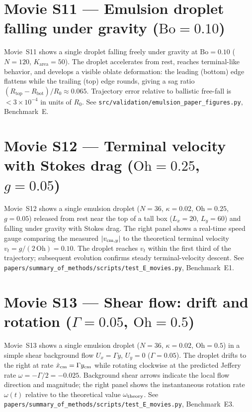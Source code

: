 \documentclass[aps,pre,twocolumn,floatfix]{revtex4-2}
\begin{document}
\section*{Movie S11 — Emulsion droplet falling under gravity ($\mathrm{Bo} = 0.10$)}

Movie~S11 shows a single droplet falling freely under gravity at
$\mathrm{Bo} = 0.10$ ($N = 120$, $K_\mathrm{area} = 50$).  The droplet
accelerates from rest, reaches terminal-like behavior, and develops a
visible oblate deformation: the leading (bottom) edge flattens while the
trailing (top) edge rounds, giving a sag ratio
$(R_\mathrm{top} - R_\mathrm{bot})/R_0 \approx 0.065$.  Trajectory error
relative to ballistic free-fall is $< 3 \times 10^{-4}$ in units of $R_0$.
See \texttt{src/validation/emulsion\_paper\_figures.py}, Benchmark~E.

\section*{Movie S12 — Terminal velocity with Stokes drag ($\mathrm{Oh} = 0.25$, $g = 0.05$)}

Movie~S12 shows a single emulsion droplet ($N = 36$, $\kappa = 0.02$,
$\mathrm{Oh} = 0.25$, $g = 0.05$) released from rest near the top of a tall box
($L_x = 20$, $L_y = 60$) and falling under gravity with Stokes drag.
The right panel shows a real-time speed gauge comparing the measured $|v_{{\rm cm},y}|$
to the theoretical terminal velocity $v_t = g/(2\,\mathrm{Oh}) = 0.10$.
The droplet reaches $v_t$ within the first third of the trajectory; subsequent
evolution confirms steady terminal-velocity descent.
See \texttt{papers/summary\_of\_methods/scripts/test\_E\_movies.py}, Benchmark~E1.

\section*{Movie S13 — Shear flow: drift and rotation ($\Gamma = 0.05$, $\mathrm{Oh} = 0.5$)}

Movie~S13 shows a single emulsion droplet ($N = 36$, $\kappa = 0.02$,
$\mathrm{Oh} = 0.5$) in a simple shear background flow $U_x = \Gamma y$,
$U_y = 0$ ($\Gamma = 0.05$).  The droplet drifts to the right at rate
$\dot{x}_{\rm cm} = \Gamma y_{\rm cm}$ while rotating clockwise at the predicted
Jeffery rate $\omega = -\Gamma/2 = -0.025$.  Background shear arrows indicate
the local flow direction and magnitude; the right panel shows the instantaneous
rotation rate $\omega(t)$ relative to the theoretical value $\omega_{\rm theory}$.
See \texttt{papers/summary\_of\_methods/scripts/test\_E\_movies.py}, Benchmark~E3.
\end{document}
